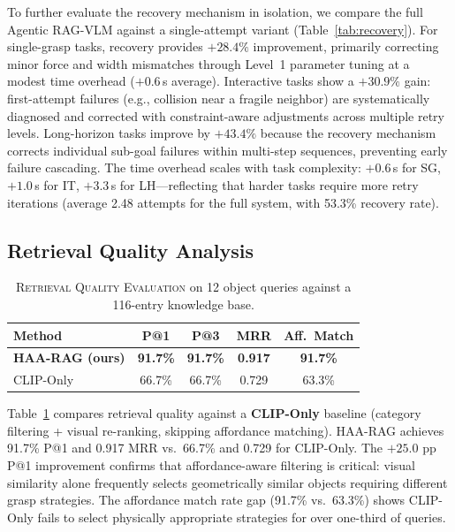 \documentclass[letterpaper, 10pt, conference]{ieeeconf}
\newcommand{\sysname}{Agentic RAG-VLM}
\newcommand{\haarag}{HAA-RAG}
\begin{document}
To further evaluate the recovery mechanism in isolation, we compare the full \sysname{} against a single-attempt variant (Table~\ref{tab:recovery}).
For single-grasp tasks, recovery provides $+28.4\%$ improvement, primarily correcting minor force and width mismatches through Level~1 parameter tuning at a modest time overhead ($+0.6$\,s average).
Interactive tasks show a $+30.9\%$ gain: first-attempt failures (e.g., collision near a fragile neighbor) are systematically diagnosed and corrected with constraint-aware adjustments across multiple retry levels.
Long-horizon tasks improve by $+43.4\%$ because the recovery mechanism corrects individual sub-goal failures within multi-step sequences, preventing early failure cascading.
The time overhead scales with task complexity: $+0.6$\,s for SG, $+1.0$\,s for IT, $+3.3$\,s for LH---reflecting that harder tasks require more retry iterations (average 2.48 attempts for the full system, with 53.3\% recovery rate).

\subsection{Retrieval Quality Analysis}
\label{sec:retrieval_exp}

\begin{table}[t]
\centering
\caption{\textsc{Retrieval Quality Evaluation} on 12 object queries against a 116-entry knowledge base.}
\label{tab:haarag}
\renewcommand{\arraystretch}{1.08}
\begin{tabular}{@{}lcccc@{}}
\toprule
\textbf{Method} & \textbf{P@1} & \textbf{P@3} & \textbf{MRR} & \textbf{Aff.\ Match} \\
\midrule
\textbf{HAA-RAG (ours)} & \textbf{91.7\%} & \textbf{91.7\%} & \textbf{0.917} & \textbf{91.7\%} \\
CLIP-Only & 66.7\% & 66.7\% & 0.729 & 63.3\% \\
\bottomrule
\end{tabular}
\vspace{-2mm}
\end{table}

Table~\ref{tab:haarag} compares retrieval quality against a \textbf{CLIP-Only} baseline (category filtering + visual re-ranking, skipping affordance matching).
\haarag{} achieves 91.7\% P@1 and 0.917 MRR vs.\ 66.7\% and 0.729 for CLIP-Only.
The $+25.0$ pp P@1 improvement confirms that affordance-aware filtering is critical: visual similarity alone frequently selects geometrically similar objects requiring different grasp strategies.
The affordance match rate gap (91.7\% vs.\ 63.3\%) shows CLIP-Only fails to select physically appropriate strategies for over one-third of queries.
\end{document}

